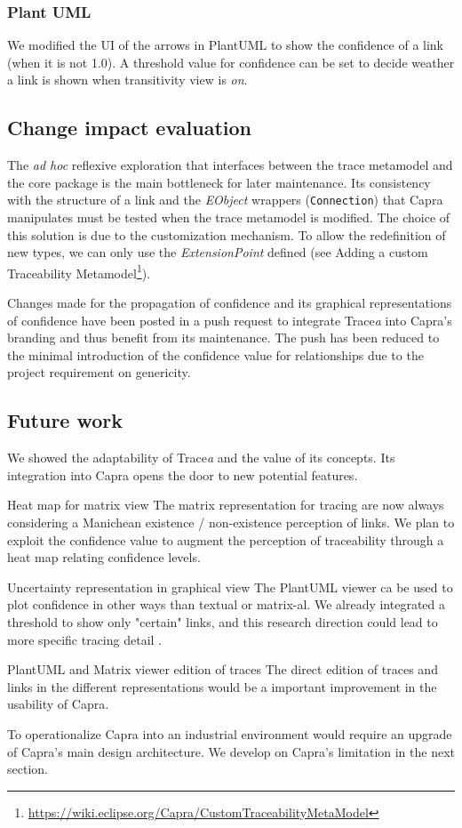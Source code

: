\subsubsection{Plant UML}
We modified the UI of the arrows in PlantUML to show the confidence of a link (when it is not 1.0). {A threshold value for confidence can be set to decide weather a link is shown when transitivity view is \textit{on}.}

\subsection{Change impact evaluation}
The \textit{ad hoc} reflexive exploration that interfaces between the trace metamodel and the core package is the main bottleneck for later maintenance. Its consistency with the structure of a link and the \textit{EObject} wrappers (\texttt{Connection}) that Capra manipulates must be tested when the trace metamodel is modified. 
The choice of this solution is due to the customization mechanism. To allow the redefinition of new types, we can only use the \textit{ExtensionPoint} defined (see Adding a custom Traceability Metamodel\footnote{\url{https://wiki.eclipse.org/Capra/CustomTraceabilityMetaModel}}).

Changes made for the propagation of confidence and its graphical representations of confidence have been posted in a push request to integrate Trace\textit{a} into Capra's branding and thus benefit from its maintenance. The push has been reduced to the minimal introduction of the confidence value for relationships due to the project requirement on genericity.

\subsection{Future work}
We showed the adaptability of Trace\textit{a} and the value of its concepts. Its integration into Capra opens the door to new potential features. 

\begin{descriptioncompact}
    \item[Heat map for matrix view] The matrix representation for tracing are now always considering a Manichean existence / non-existence perception of links. We plan to exploit the confidence value to augment the perception of traceability through a heat map relating confidence levels.
    \item[Uncertainty representation in graphical view] The PlantUML viewer ca be used to plot confidence in other ways than textual or matrix-al. We already integrated a threshold to show only "certain" links, and this research direction could lead to more specific tracing detail .
    \item[PlantUML and Matrix viewer edition of traces] The direct edition of traces and links in the different representations would be a important improvement in the usability of Capra.
    
\end{descriptioncompact}

To operationalize Capra into an industrial environment would require an upgrade of Capra's main design architecture. We develop on Capra's limitation in the next section. 

